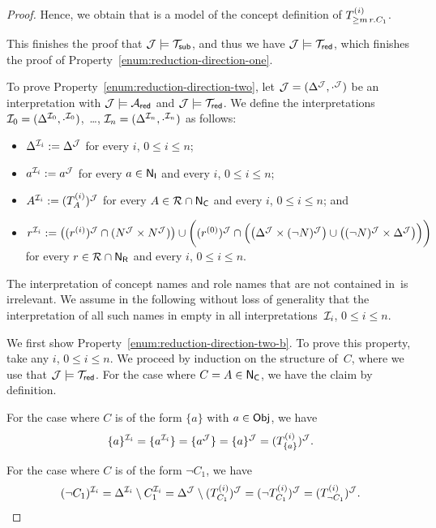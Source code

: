 \begin{proof}
    \noindent
    Hence, we obtain that \Jmc is a model of the concept definition of
    $T_{{\ge}m\,r.C_1}^{(i)}$.

    This finishes the proof that $\mathcal{J}\models\mathcal{T}_\mathsf{sub}$, and thus we have
    $\mathcal{J}\models\mathcal{T}_\mathsf{red}$, which finishes the proof of
    Property~\eqref{enum:reduction-direction-one}.

    To prove Property~\eqref{enum:reduction-direction-two}, let
    $\mathcal{J}=(\Delta^\mathcal{J},\cdot^\mathcal{J})$ be an interpretation with $\mathcal{J}\models\mathcal{A}_\mathsf{red}$
    and $\mathcal{J}\models\mathcal{T}_\mathsf{red}$.  We define the interpretations
    $\mathcal{I}_0=(\Delta^{\mathcal{I}_0},\cdot^{\mathcal{I}_0})$,~\dots,
    $\mathcal{I}_n=(\Delta^{\mathcal{I}_n},\cdot^{\mathcal{I}_n})$ as follows:
    \begin{itemize}
        \item $\Delta^{\mathcal{I}_i}:=\Delta^\mathcal{J}$ for every $i$, $0\le i\le n$;
        \item $a^{\mathcal{I}_i}:=a^\mathcal{J}$ for every $a\in\mathsf{N_I}$ and every $i$,
            $0\le i\le n$;
        \item $A^{\mathcal{I}_i}:=(T_A^{(i)})^\mathcal{J}$ for every $A\in\mathcal{R}\cap\mathsf{N_C}$ and
            every $i$, $0\le i\le n$; and
        \item $r^{\Imc_i}:=\bigl((r^{(i)})^\Jmc\cap(N^\Jmc\times N^\Jmc)\bigr)\cup%
                \biggl((r^{(0)})^\Jmc\cap\Bigl(\bigl(\Delta^\Jmc\times(\lnot N)^\Jmc\bigr)\cup%
                \bigl((\lnot N)^\Jmc\times\Delta^\Jmc\bigr)\Bigr)\biggr)$
            for every $r\in\mathcal{R}\cap\mathsf{N_R}$ and every $i$, $0\le i\le n$.
    \end{itemize}
    The interpretation of concept names and role names that are not contained
    in~\Rmc is irrelevant.  We assume in the following without loss of
    generality that the interpretation of all such names in empty in all
    interpretations~$\mathcal{I}_i$, $0\le i\le n$.

    We first show Property~\eqref{enum:reduction-direction-two-b}.  To prove
    this property, take any $i$, $0\le i\le n$.  We proceed by induction on the
    structure of~$C$, where we use that $\mathcal{J}\models\mathcal{T}_\mathsf{red}$.
    For the case where $C=A\in\mathsf{N_C}$, we have the claim by definition.

    For the case where $C$ is of the form $\{a\}$ with $a\in\mathsf{Obj}$, we have
    \[\{a\}^{\Imc_i}%
        =\{a^{\Imc_i}\}%
        =\{a^\Jmc\}=\{a\}^\Jmc%
        =(T_{\{a\}}^{(i)})^\Jmc.\]

    \noindent
    For the case where $C$ is of the form $\lnot C_1$, we have
    \[(\lnot C_1)^{\Imc_i}%
        =\Delta^{\Imc_i}\setminus C_1^{\Imc_i}%
        =\Delta^\Jmc\setminus(T_{C_1}^{(i)})^\Jmc%
        =(\lnot T_{C_1}^{(i)})^\Jmc%
        =(T_{\lnot C_1}^{(i)})^\Jmc.\]


\end{proof}
